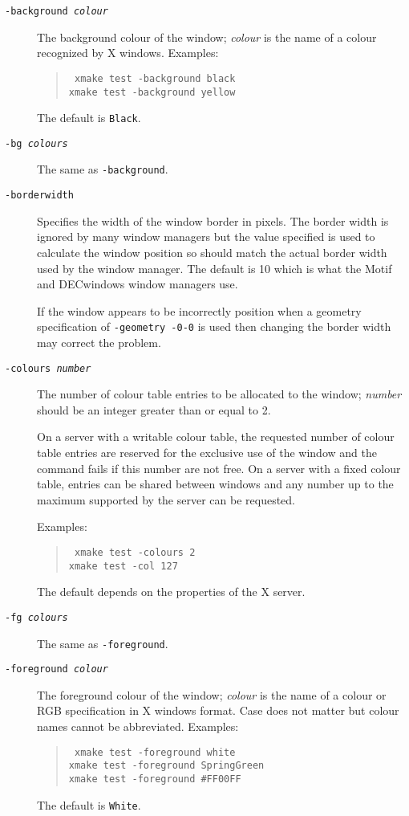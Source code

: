 \begin{description}

\item[\tt -background {\em colour}] The background colour of the window; {\em
colour} is the name of a colour recognized by X windows. Examples:
\begin{quote}\tt
xmake test -background black\\
xmake test -background yellow
\end{quote}
The default is {\tt Black}.

\item[\tt -bg {\em colours}] The same as {\tt -background}.

\item[\tt -borderwidth] Specifies the width of the window border in
pixels. The
border width is ignored by many window managers but the value specified
is used to calculate the window position so should match the actual
border width used by the window manager. The default is 10 which is what
the Motif and DECwindows window managers use. 

If the window appears to
be incorrectly position when a geometry specification of {\tt -geometry
-0-0} is used then changing the border width may correct the problem.

\item[\tt -colours {\em number}] The number of colour table entries to be
allocated to the window; {\em number} should be an integer greater than or
equal to 2. 

On a server with a writable colour table, the requested number of colour table
entries are reserved for the exclusive use of the window and the command fails
if this number are not free. On a server with a fixed colour table, entries can
be shared between windows and any number up to the maximum supported by the
server can be requested. 

Examples:
\begin{quote}\tt
xmake test -colours 2\\
xmake test -col 127
\end{quote}
The default depends on the properties of the X server.

\item[\tt -fg {\em colours}] The same as {\tt -foreground}.

\item[\tt -foreground {\em colour}] The foreground colour of the window; {\em
colour} is the name of a colour or RGB specification in X windows format.
Case does not matter but colour names cannot be abbreviated. 
Examples:
\begin{quote}\tt
xmake test -foreground white\\
xmake test -foreground SpringGreen\\
xmake test -foreground \#FF00FF
\end{quote}
The default is {\tt White}.


\end{description}
